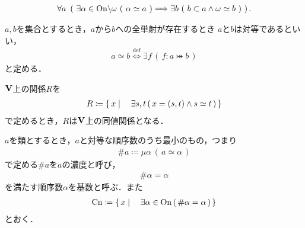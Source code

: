 	\begin{screen}
		\begin{dfn}[有限・可算・無限]
			
		\end{dfn}
	\end{screen}
	
	\begin{screen}
		\begin{thm}[任意の無限集合は可算集合を含む]
			\begin{align}
				\forall a\ \left(\ \exists \alpha \in \mathrm{On} \backslash {\bf \omega}\ (\  \alpha \simeq a\ )
				\Longrightarrow \exists b\ (\ b \subset a \wedge {\bf \omega} \simeq b\ )\ \right).
			\end{align}
		\end{thm}
	\end{screen}
	
	\begin{screen}
		\begin{dfn}[対等]
			$a,b$を集合とするとき，$a$から$b$への全単射が存在するとき
			$a$と$b$は対等であるといい，
			\begin{align}
				a \simeq b \overset{\mathrm{def}}{\Longleftrightarrow} 
				\exists f\, \left(\, f: a \bij b\, \right)
			\end{align}
			と定める．
		\end{dfn}
	\end{screen}
	
	\begin{screen}
		\begin{thm}[対等関係は同値関係]
			$\mathbf{V}$上の関係$R$を
			\begin{align}
				R \coloneqq \left\{\, x \mid \quad \exists s,t\, (\, x=(s,t) \wedge s \simeq t\, )\, \right\}
			\end{align}
			で定めるとき，$R$は$\mathbf{V}$上の同値関係となる．
		\end{thm}
	\end{screen}
	
	\begin{screen}
		\begin{dfn}[濃度・基数]
			$a$を類とするとき，$a$と対等な順序数のうち最小のもの，つまり
			\begin{align}
				\# a \coloneqq \mu \alpha\, (\, a \simeq \alpha\, )
			\end{align}
			で定める$\# a$を$a$の濃度と呼び，
			\begin{align}
				\# \alpha = \alpha
			\end{align}
			を満たす順序数$\alpha$を基数と呼ぶ．また
			\begin{align}
				\mathrm{Cn} \coloneqq \left\{\, x \mid \quad \exists \alpha \in \mathrm{On}\, (\, \#\alpha = \alpha\, )\, \right\}
			\end{align}
			とおく．
		\end{dfn}
	\end{screen}
	
